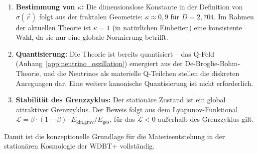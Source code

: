 \begin{enumerate}
    \item \textbf{Bestimmung von \( \kappa \):} Die dimensionslose Konstante in der Definition von \( \sigma(\vec{r}) \) folgt aus der fraktalen Geometrie: \( \kappa \approx 0,9 \) für \( D = 2,704 \). Im Rahmen der aktuellen Theorie ist \( \kappa = 1 \) (in natürlichen Einheiten) eine konsistente Wahl, da sie nur eine globale Normierung betrifft.

    \item \textbf{Quantisierung:} Die Theorie ist bereits quantisiert – das Q-Feld (Anhang~\ref{app:neutrino_oszillation}) emergiert aus der De-Broglie-Bohm-Theorie, und die Neutrinos als materielle Q-Teilchen stellen die diskreten Anregungen dar. Eine weitere kanonische Quantisierung ist nicht erforderlich.

    \item \textbf{Stabilität des Grenzzyklus:} Der stationäre Zustand ist ein global attraktiver Grenzzyklus. Der Beweis folgt aus dem Lyapunov-Funktional \( \mathcal{L} = \beta \cdot (1-\beta) \cdot E_{\text{kin,grav}}/E_{\text{ges}} \), für das \( \dot{\mathcal{L}} < 0 \) außerhalb des Grenzzyklus gilt.
\end{enumerate}

Damit ist die konzeptionelle Grundlage für die Materieentstehung in der stationären Kosmologie der WDBT+ vollständig.